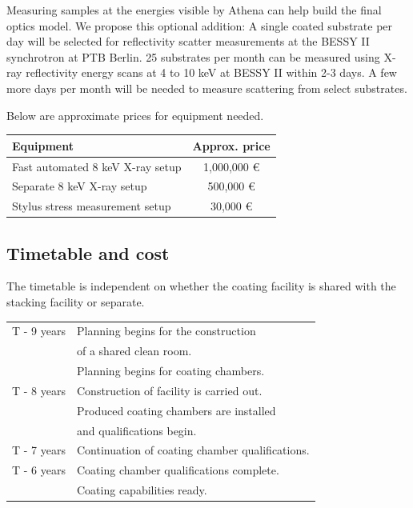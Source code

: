 Measuring samples at the energies visible by Athena can help build the final optics model. We propose this optional addition: A single coated substrate per day will be selected for reflectivity scatter measurements at the BESSY II synchrotron at PTB Berlin. 25 substrates per month can be measured using X-ray reflectivity energy scans at 4 to 10 keV at BESSY II within 2-3 days. A few more days per month will be needed to measure scattering from select substrates.

Below are approximate prices for equipment needed.

\begin{table}[htbp]
	\centering
\begin{tabular}{l|c}
Equipment & Approx. price\\
\hline
\hline
Fast automated 8 keV X-ray setup  & 1,000,000 \euro\\
\hline
Separate 8 keV X-ray setup & 500,000 \euro\\
\hline
Stylus stress measurement setup & 30,000 \euro\\
\end{tabular}
\end{table}



\subsection{Timetable and cost}

The timetable is independent on whether the coating facility is shared with the stacking facility or separate.\\

\begin{table}[htbp]
	\centering
\begin{tabular}{c|l}
T - 9 years & Planning begins for the construction\\
  & \hspace{1cm} of a shared clean room. \\
			& Planning begins for coating chambers.\\
\hline
T - 8 years & Construction of facility is carried out.\\
			& Produced coating chambers are installed\\
      & \hspace{1cm} and qualifications begin.\\
\hline
T - 7 years & Continuation of coating chamber qualifications.\\
\hline
T - 6 years & Coating chamber qualifications complete.\\
			& Coating capabilities ready.\\

\end{tabular}
\end{table}

